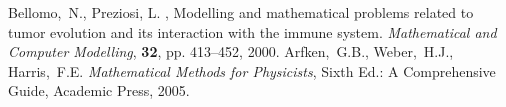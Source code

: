 \begin{thebibliography}{999}
 Bellomo,~N., Preziosi, L. , Modelling and mathematical problems
    related to tumor evolution and its interaction with the immune
    system. \textit{Mathematical and Computer Modelling}, \textbf{32},  pp. 413--452, 2000.
 Arfken,~G.B., Weber,~H.J., Harris,~F.E. \textit{Mathematical Methods for Physicists}, Sixth Ed.: A Comprehensive Guide, Academic Press, 2005.
\end{thebibliography}